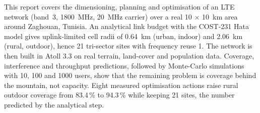 This report covers the dimensioning, planning and optimisation of an LTE network (band~3, 1800~MHz, 20~MHz carrier) over a real 10 × 10~km area around Zaghouan, Tunisia. An analytical link budget with the COST-231 Hata model gives uplink-limited cell radii of 0.64~km (urban, indoor) and 2.06~km (rural, outdoor), hence 21 tri-sector sites with frequency reuse 1. The network is then built in Atoll 3.3 on real terrain, land-cover and population data. Coverage, interference and throughput predictions, followed by Monte-Carlo simulations with 10, 100 and 1000 users, show that the remaining problem is coverage behind the mountain, not capacity. Eight measured optimisation actions raise rural outdoor coverage from 83.4\,\% to 94.3\,\% while keeping 21 sites, the number predicted by the analytical step.
